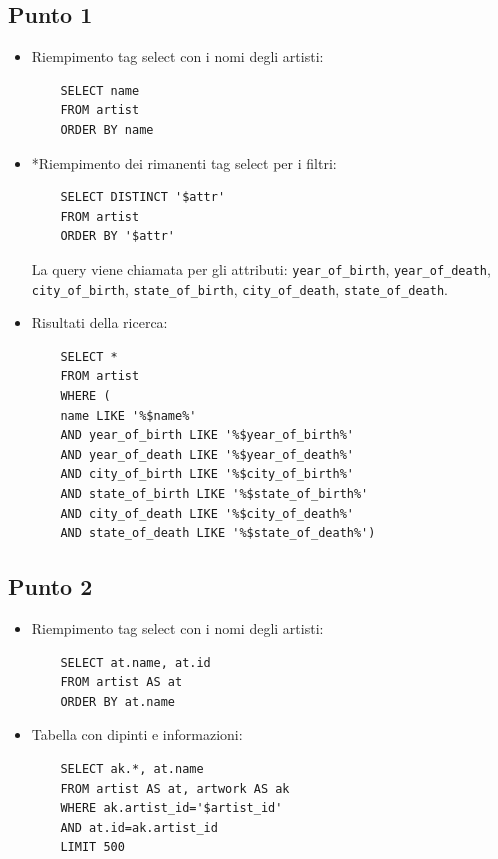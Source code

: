 \documentclass{ol-softwaremanual}
\begin{document}
\subsection{Punto 1}
\begin{itemize}
    \item Riempimento tag select con i nomi degli artisti:
    \begin{verbatim}
    SELECT name
    FROM artist
    ORDER BY name
    \end{verbatim}
    \item *Riempimento dei rimanenti tag select per i filtri:
    \begin{verbatim}
    SELECT DISTINCT '$attr'
    FROM artist
    ORDER BY '$attr'
    \end{verbatim}
    La query viene chiamata per gli attributi: \verb|year_of_birth|, \verb|year_of_death|, \\
    \verb|city_of_birth|, \verb|state_of_birth|, \verb|city_of_death|, \verb|state_of_death|.
    \item Risultati della ricerca:
    \begin{verbatim}
    SELECT *
    FROM artist
    WHERE (
    name LIKE '%$name%' 
    AND year_of_birth LIKE '%$year_of_birth%'
    AND year_of_death LIKE '%$year_of_death%'
    AND city_of_birth LIKE '%$city_of_birth%' 
    AND state_of_birth LIKE '%$state_of_birth%' 
    AND city_of_death LIKE '%$city_of_death%' 
    AND state_of_death LIKE '%$state_of_death%')
    \end{verbatim}
\end{itemize}

\subsection{Punto 2}
\begin{itemize}
    \item Riempimento tag select con i nomi degli artisti:
    \begin{verbatim}
    SELECT at.name, at.id 
    FROM artist AS at 
    ORDER BY at.name
    \end{verbatim}
    \item Tabella con dipinti e informazioni:
    \begin{verbatim}
    SELECT ak.*, at.name 
    FROM artist AS at, artwork AS ak
    WHERE ak.artist_id='$artist_id'
    AND at.id=ak.artist_id
    LIMIT 500
    \end{verbatim}
\end{itemize}
\end{document}
